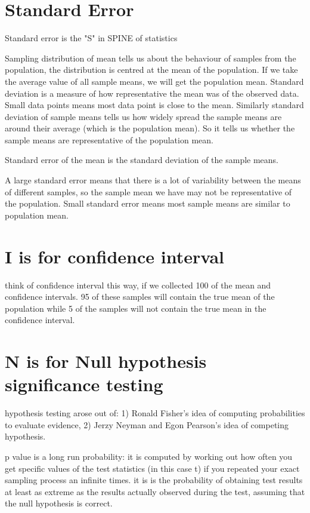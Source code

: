 \section{Standard Error}
Standard error is the "S" in SPINE of statistics

Sampling distribution of mean tells us about the behaviour of samples from the population, the distribution is centred at the mean of the population. If we take the average value of all sample means, we will get the population mean. 
Standard deviation is a measure of how representative the mean was of the observed data. Small data points means most data point is close to the mean.  Similarly standard deviation of sample means tells us how widely spread the sample means are around their average (which is the population mean). So it tells us whether the sample means are representative of the population mean. 

Standard error of the mean is the standard deviation of the sample means. 

A large standard error means that there is a lot of variability between the means of different samples, so the sample mean we have may not be representative of the population. Small standard error means most sample means are similar to population mean.

\section{I is for confidence interval}
think of confidence interval this way, if we collected 100 of the mean and confidence intervals. 95 of these samples will contain the true mean of the population while 5 of the samples will not contain the true mean in the confidence interval.

\section{N is for Null hypothesis significance testing}
hypothesis testing arose out of: 1) Ronald Fisher's idea of computing probabilities to evaluate evidence, 2) Jerzy Neyman and Egon Pearson's idea of competing hypothesis. 

p value is a long run probability: it is computed by working out how often you get specific values of the test statistics (in this case t) if you repeated your exact sampling process an infinite times. it is is the probability of obtaining test results at least as extreme as the results actually observed during the test, assuming that the null hypothesis is correct.

